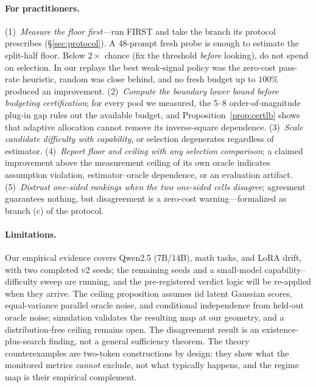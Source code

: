 \documentclass[11pt]{article}
\begin{document}
\paragraph{For practitioners.} (1)~\emph{Measure the floor first}---run
FIRST and take the branch its protocol prescribes (\S\ref{sec:protocol}). A
48-prompt fresh probe is enough to estimate the split-half floor. Below
$2\times$ chance (fix the threshold \emph{before} looking), do not spend on
selection. In our replays the best weak-signal policy was the zero-cost pass-rate
heuristic, random was close behind, and no fresh budget up to $100\%$
produced an improvement.
(2)~\emph{Compute the boundary lower bound before budgeting certification};
for every pool we measured, the 5--8 order-of-magnitude plug-in gap rules out
the available budget, and Proposition~\ref{prop:certlb} shows that adaptive
allocation cannot remove its inverse-square dependence. (3)~\emph{Scale
candidate difficulty with capability}, or
selection degenerates regardless of estimator. (4)~\emph{Report floor and
ceiling with any selection comparison}; a claimed improvement above the
measurement ceiling of its own oracle indicates assumption violation,
estimator--oracle dependence, or an evaluation artifact.
(5)~\emph{Distrust one-sided rankings when the two one-sided cells disagree};
agreement guarantees nothing, but disagreement is a zero-cost warning---formalized
as branch (c) of the protocol.

\paragraph{Limitations.} Our empirical evidence covers Qwen2.5 (7B/14B),
math tasks, and LoRA drift, with two completed v2 seeds; the remaining seeds
and a small-model capability--difficulty sweep are running, and the
pre-registered verdict logic will be re-applied when they arrive. The
ceiling proposition assumes iid latent Gaussian scores, equal-variance
parallel oracle noise, and conditional independence from held-out oracle
noise; simulation validates the resulting map at our geometry, and a
distribution-free ceiling remains open.
The disagreement result is an existence-plus-search finding, not a general
sufficiency theorem. The theory counterexamples are two-token constructions
by design: they show what the monitored metrics \emph{cannot} exclude, not
what typically happens, and the regime map is their empirical complement.
\end{document}
